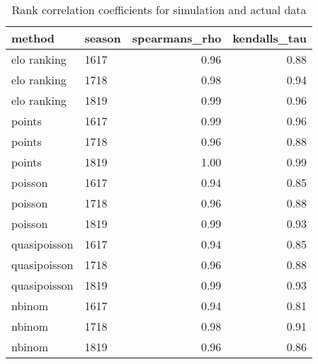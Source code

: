\begin{table}[ht]
\centering
\begin{tabular}{llrr}
  \hline
method & season & spearmans\_rho & kendalls\_tau \\ 
  \hline
elo ranking & 1617 & 0.96 & 0.88 \\ 
  elo ranking & 1718 & 0.98 & 0.94 \\ 
  elo ranking & 1819 & 0.99 & 0.96 \\ 
  points & 1617 & 0.99 & 0.96 \\ 
  points & 1718 & 0.96 & 0.88 \\ 
  points & 1819 & 1.00 & 0.99 \\ 
  poisson & 1617 & 0.94 & 0.85 \\ 
  poisson & 1718 & 0.96 & 0.88 \\ 
  poisson & 1819 & 0.99 & 0.93 \\ 
  quasipoisson & 1617 & 0.94 & 0.85 \\ 
  quasipoisson & 1718 & 0.96 & 0.88 \\ 
  quasipoisson & 1819 & 0.99 & 0.93 \\ 
  nbinom & 1617 & 0.94 & 0.81 \\ 
  nbinom & 1718 & 0.98 & 0.91 \\ 
  nbinom & 1819 & 0.96 & 0.86 \\ 
   \hline
\end{tabular}
\caption{Rank correlation coefficients for simulation and actual data} 
\end{table} 
